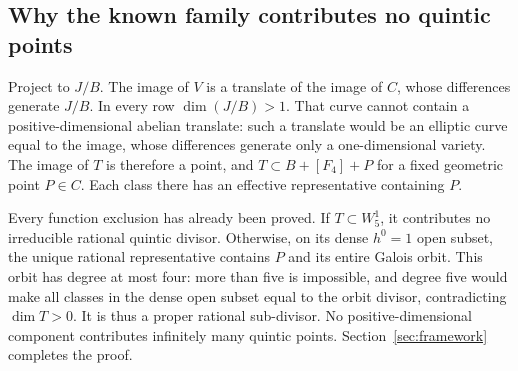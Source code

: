\documentclass[11pt,a4paper]{article}
\begin{document}
\subsection{Why the known family contributes no quintic points}
Project to $J/B$. The image of $V$ is a translate of the image of $C$,
whose differences generate $J/B$.
In every row $\dim(J/B)>1$. That curve cannot contain a positive-dimensional
abelian translate: such a translate would be an elliptic curve equal to
the image, whose differences generate only a one-dimensional variety.
The image of $T$ is therefore a point, and
$T\subset B+[F_4]+P$ for a fixed geometric point $P\in C$.
Each class there has an effective representative containing $P$.

Every function exclusion has already been proved.
If $T\subset W^1_5$, it contributes no irreducible rational quintic divisor.
Otherwise, on its dense $h^0=1$ open subset, the unique rational
representative contains $P$ and its entire Galois orbit.
This orbit has degree at most four: more than five is impossible,
and degree five would make all classes in the dense open subset equal
to the orbit divisor, contradicting $\dim T>0$.
It is thus a proper rational sub-divisor.
No positive-dimensional component contributes infinitely many quintic
points. Section~\ref{sec:framework} completes the proof.
\end{document}
